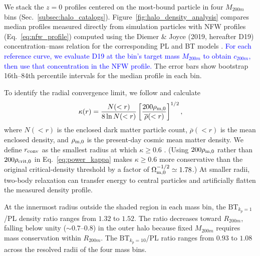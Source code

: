 \documentclass[
 reprint,
 superscriptaddress,
 nofootinbib,
 nobibnotes,
 amsmath,
 amssymb,
 aps,
 prd,
 floatfix,
 longbibliography
]{revtex4-2}
\DeclareRobustCommand{\change}[1]{\textcolor{blue}{#1}}
\DeclareRobustCommand{\BTKPone}{\ensuremath{\mathrm{BT}_{k_p=1}}}
\DeclareRobustCommand{\BTKPten}{\ensuremath{\mathrm{BT}_{k_p=10}}}
\begin{document}
We stack the \(z=0\) profiles centered on the most-bound particle in four \(M_{200m}\) bins (Sec.~\ref{subsec:halo_catalogs}). Figure~\ref{fig:halo_density_analysis} compares median profiles measured directly from simulation particles with NFW profiles (Eq.~\ref{eq:nfw_profile}) computed using the Diemer \& Joyce (2019, hereafter D19) concentration--mass relation for the corresponding PL and BT models \citep{Diemer2019}. \change{For each reference curve, we evaluate D19 at the bin's target mass \(M_{200m}\) to obtain \(c_{200m}\), then use that concentration in the NFW profile.} The error bars show bootstrap 16th--84th percentile intervals for the median profile in each bin.

To identify the radial convergence limit, we follow \citet{Power2003} and calculate
\begin{equation}
\kappa(r)=\frac{N(<r)}{8\ln N(<r)}
\left[\frac{200\rho_{{\rm m},0}}{\overline{\rho}(<r)}\right]^{1/2},
\label{eq:power_kappa}
\end{equation}
where \(N(<r)\) is the enclosed dark matter particle count, \(\overline{\rho}(<r)\) is the mean enclosed density, and \(\rho_{{\rm m},0}\) is the present-day cosmic mean matter density. We define \(r_{\rm conv}\) as the smallest radius at which \(\kappa\ge0.6\) \citep{Power2003}. (Using \(200\rho_{{\rm m},0}\) rather than \(200\rho_{{\rm crit},0}\) in Eq.~\eqref{eq:power_kappa} makes \(\kappa\ge0.6\) more conservative than the original critical-density threshold by a factor of \(\Omega_{{\rm m},0}^{-1/2}\simeq1.78\).) At smaller radii, two-body relaxation can transfer energy to central particles and artificially flatten the measured density profile.

At the innermost radius outside the shaded region in each mass bin, the \BTKPone{}/PL density ratio ranges from \(1.32\) to \(1.52\). The ratio decreases toward \(R_{200m}\), falling below unity (\(\sim0.7\)--\(0.8\)) in the outer halo because fixed \(M_{200m}\) requires mass conservation within \(R_{200m}\). The \BTKPten{}/PL ratio ranges from \(0.93\) to \(1.08\) across the resolved radii of the four mass bins.
\end{document}
